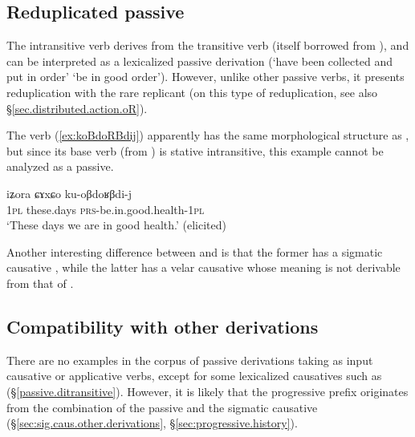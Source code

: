 \subsection{Reduplicated passive} \label{passive.redp}
The intransitive verb  derives from the transitive verb  (itself borrowed from ), and can be interpreted as a lexicalized passive derivation (`have been collected and put in order' \fl{} `be in good order'). However, unlike other passive verbs, it presents reduplication with the rare  replicant (on this type of reduplication, see also §\ref{sec.distributed.action.oR}).

The verb  (\ref{ex:koBdoRBdij}) apparently has the same morphological structure as , but since its base verb  (from ) is stative intransitive, this example cannot be analyzed as a passive.

\begin{exe}
\ex \label{ex:koBdoRBdij}
\gll iʑora ɕɤxɕo ku-oβdoʁβdi-j \\
\textsc{1pl} these.days \textsc{prs}-be.in.good.health-\textsc{1pl} \\
\glt `These days we are in good health.' (elicited)
\end{exe} 

Another interesting difference between   and  is that the former has a sigmatic causative , while the latter has a velar causative   whose meaning is not derivable from that of .

\subsection{Compatibility with other derivations} \label{sec:passive.other.derivations}
There are no examples in the corpus of passive derivations taking as input causative or applicative verbs, except for some lexicalized causatives such as  (§\ref{passive.ditransitive}). However, it is likely that the progressive prefix  originates from the combination of the passive and the sigmatic causative (§\ref{sec:sig.caus.other.derivations}, §\ref{sec:progressive.history}).

